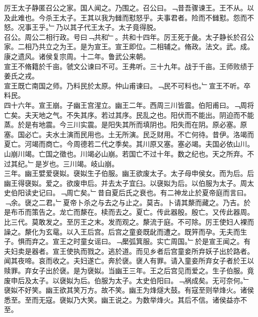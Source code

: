 \documentclass{zhvt-classic}
\begin{document}
\hspace*{2em}厉王太子静匿召公之家。国人闻之。乃围之。召公曰。﹁昔吾骤谏王。王不从。以及此难也。今杀王太子。王其以我为雠而懟怒乎。夫事君者。险而不雠懟。怨而不怒。况事王乎。﹂乃以其子代王太子。太子竟得脱。\\
\hspace*{2em}召公。周公二相行政。号曰﹁共和﹂。共和十四年。厉王死于彘。太子静长於召公家。二相乃共立之为王。是为宣王。宣王即位。二相辅之。脩政。法文。武。成。康之遗风。诸侯复宗周。十二年。鲁武公来朝。\\
\hspace*{2em}宣王不脩籍於千亩。虢文公谏曰不可。王弗听。三十九年。战于千亩。王师败绩于姜氏之戎。\\
\hspace*{2em}宣王既亡南国之师。乃料民於太原。仲山甫谏曰。﹁民不可料也。﹂宣王不听。卒料民。\\
\hspace*{2em}四十六年。宣王崩。子幽王宫湦立。幽王二年。西周三川皆震。伯阳甫曰。﹁周将亡矣。夫天地之气。不失其序。若过其序。民乱之也。阳伏而不能出。阴迫而不能蒸。於是有地震。今三川实震。是阳失其所而填阴也。阳失而在阴。原必塞。原塞。国必亡。夫水土演而民用也。土无所演。民乏财用。不亡何待。昔伊。洛竭而夏亡。河竭而商亡。今周德若二代之季矣。其川原又塞。塞必竭。夫国必依山川。山崩川竭。亡国之徵也。川竭必山崩。若国亡不过十年。数之纪也。天之所弃。不过其纪。﹂是岁也。三川竭。岐山崩。\\
\hspace*{2em}三年。幽王嬖爱襃姒。襃姒生子伯服。幽王欲废太子。太子母申侯女。而为后。后幽王得襃姒。爱之。欲废申后。并去太子宜臼。以襃姒为后。以伯服为太子。周太史伯阳读史记曰。﹁周亡矣。﹂昔自夏后氏之衰也。有二神龙止於夏帝庭而言曰。﹁余。襃之二君。﹂夏帝卜杀之与去之与止之。莫吉。卜请其漦而藏之。乃吉。於是布币而策告之。龙亡而漦在。椟而去之。夏亡。传此器殷。殷亡。又传此器周。比三代。莫敢发之。至厉王之末。发而观之。漦流于庭。不可除。厉王使妇人裸而譟之。漦化为玄鼋。以入王后宫。后宫之童妾既龀而遭之。既笄而孕。无夫而生子。惧而弃之。宣王之时童女谣曰。﹁檿弧箕服。实亡周国。﹂於是宣王闻之。有夫妇卖是器者。宣王使执而戮之。逃於道。而见乡者后宫童妾所弃妖子出於路者。闻其夜啼。哀而收之。夫妇遂亡。奔於襃。襃人有罪。请入童妾所弃女子者於王以赎罪。弃女子出於襃。是为襃姒。当幽王三年。王之后宫见而爱之。生子伯服。竟废申后及太子。以襃姒为后。伯服为太子。太史伯阳曰。﹁祸成矣。无可奈何。﹂\\
\hspace*{2em}襃姒不好笑。幽王欲其笑万方。故不笑。幽王为烽燧大鼓。有寇至则举烽火。诸侯悉至。至而无寇。襃姒乃大笑。幽王说之。为数举烽火。其后不信。诸侯益亦不至。\\
\end{document}
